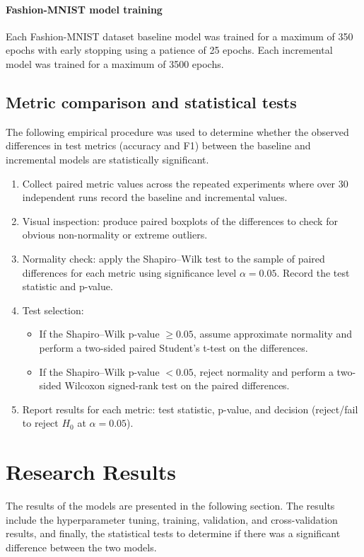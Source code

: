 \documentclass[conference]{IEEEtran}
\begin{document}
\paragraph{Fashion-MNIST model training}
 Each Fashion-MNIST dataset baseline model was trained for a maximum of 350 epochs with early stopping using a patience of 25 epochs. Each incremental 
 model was trained for a maximum of 3500 epochs.

\subsection{Metric comparison and statistical tests}
The following empirical procedure was used to determine whether the observed differences in test metrics (accuracy and F1) between the baseline and incremental models are statistically significant.

\begin{enumerate}
  \item Collect paired metric values across the repeated experiments where over 30 independent runs record the baseline and incremental values. 
  \item Visual inspection: produce paired boxplots of the differences to check for obvious non-normality or extreme outliers.
  \item Normality check: apply the Shapiro--Wilk test to the sample of paired differences for each metric using significance level \(\alpha=0.05\). Record the test statistic and p-value.
  \item Test selection:
    \begin{itemize}
      \item If the Shapiro--Wilk p-value \(\ge 0.05\), assume approximate normality and perform a two-sided paired Student's t-test on the differences.
      \item If the Shapiro--Wilk p-value \(< 0.05\), reject normality and perform a two-sided Wilcoxon signed-rank test on the paired differences.
    \end{itemize}
  \item Report results for each metric: test statistic, p-value, and decision (reject/fail to reject $H_0$ at \(\alpha=0.05\)).
\end{enumerate}


\section{Research Results}
The results of the models are presented in the following section. The results include the hyperparameter tuning, training, validation, and
 cross-validation results, and finally, the statistical tests to determine if there was a significant difference between the two models.
\end{document}
